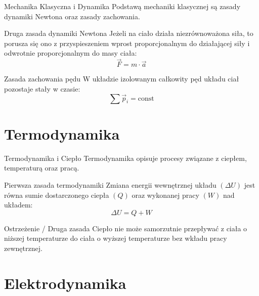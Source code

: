 \documentclass[aspectratio=169]{beamer}
\begin{document}
\begin{frame}{Mechanika Klasyczna i Dynamika}
    Podstawą mechaniki klasycznej są zasady dynamiki Newtona oraz zasady zachowania.
    
    \begin{block}{Druga zasada dynamiki Newtona}
        Jeżeli na ciało działa niezrównoważona siła, to porusza się ono z przyspieszeniem wprost proporcjonalnym do działającej siły i odwrotnie proporcjonalnym do masy ciała:
        \begin{equation}
            \vec{F} = m \cdot \vec{a}
        \end{equation}
    \end{block}
    
    \begin{exampleblock}{Zasada zachowania pędu}
        W układzie izolowanym całkowity pęd układu ciał pozostaje stały w czasie:
        \begin{equation}
            \sum \vec{p}_i = \text{const}
        \end{equation}
    \end{exampleblock}
\end{frame}

\section{Termodynamika}

\begin{frame}{Termodynamika i Ciepło}
    Termodynamika opisuje procesy związane z ciepłem, temperaturą oraz pracą.
    
    \begin{block}{Pierwsza zasada termodynamiki}
        Zmiana energii wewnętrznej układu $(\Delta U)$ jest równa sumie dostarczonego ciepła $(Q)$ oraz wykonanej pracy $(W)$ nad układem:
        \begin{equation}
            \Delta U = Q + W
        \end{equation}
    \end{block}

    \begin{alertblock}{Ostrzeżenie / Druga zasada}
        Ciepło nie może samorzutnie przepływać z ciała o niższej temperaturze do ciała o wyższej temperaturze bez wkładu pracy zewnętrznej.
    \end{alertblock}
\end{frame}

\section{Elektrodynamika}
\end{document}
